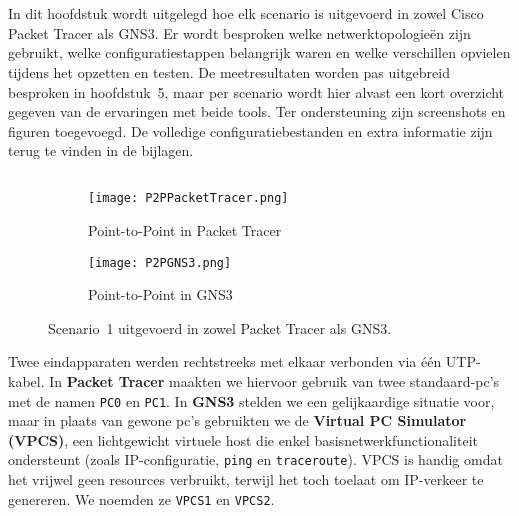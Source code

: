 \chapter{}
\label{ch:proof_of_concept}

In dit hoofdstuk wordt uitgelegd hoe elk scenario is uitgevoerd in zowel Cisco Packet Tracer als GNS3. Er wordt besproken welke netwerktopologieën zijn gebruikt, welke configuratiestappen belangrijk waren en welke verschillen opvielen tijdens het opzetten en testen. De meetresultaten worden pas uitgebreid besproken in hoofdstuk~5, maar per scenario wordt hier alvast een kort overzicht gegeven van de ervaringen met beide tools. Ter ondersteuning zijn screenshots en figuren toegevoegd. De volledige configuratiebestanden en extra informatie zijn terug te vinden in de bijlagen.

\section{}
\label{sec:scenario1}

\subsection{}
\label{sec:topologie}

\begin{figure}[H]
    \centering
    \begin{subfigure}[b]{0.48\textwidth}
        \texttt{[image: P2PPacketTracer.png]}
        \caption{Point-to-Point in Packet Tracer}
        \label{fig:pt_scenario1}
    \end{subfigure}
    \hfill
    \begin{subfigure}[b]{0.48\textwidth}
        \texttt{[image: P2PGNS3.png]}
        \caption{Point-to-Point in GNS3}
        \label{fig:gns3_scenario1}
    \end{subfigure}
    \caption[Scenario 1 in beide tools.]{\label{fig:scenario1}Scenario~1 uitgevoerd in zowel Packet Tracer als GNS3.}
\end{figure}



Twee eindapparaten werden rechtstreeks met elkaar verbonden via één UTP-kabel. In \textbf{Packet Tracer} maakten we hiervoor gebruik van twee standaard-pc’s met de namen \texttt{PC0} en \texttt{PC1}. In \textbf{GNS3} stelden we een gelijkaardige situatie voor, maar in plaats van gewone pc’s gebruikten we de \textbf{Virtual PC Simulator (VPCS)}, een lichtgewicht virtuele host die enkel basisnetwerkfunctionaliteit ondersteunt (zoals IP-configuratie, \texttt{ping} en \texttt{traceroute}). VPCS is handig omdat het vrijwel geen resources verbruikt, terwijl het toch toelaat om IP-verkeer te genereren. We noemden ze \texttt{VPCS1} en \texttt{VPCS2}.


